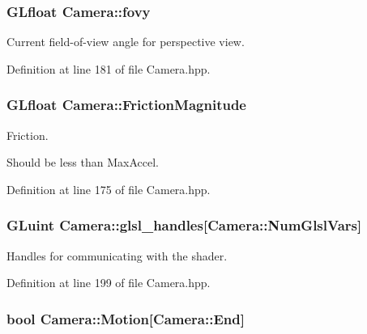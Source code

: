\hypertarget{class_camera_acc8b97facc57059530efad534c2f8314}{
\subsubsection[{fovy}]{\setlength{\rightskip}{0pt plus 5cm}G\-Lfloat Camera\-::fovy\hspace{0.3cm}{\ttfamily [private]}}}\label{class_camera_acc8b97facc57059530efad534c2f8314}


Current field-\/of-\/view angle for perspective view. 



Definition at line 181 of file Camera.\-hpp.

\hypertarget{class_camera_a4260507a4e59b2b079a0e1c6a5b64d5c}{
\subsubsection[{Friction\-Magnitude}]{\setlength{\rightskip}{0pt plus 5cm}G\-Lfloat Camera\-::\-Friction\-Magnitude\hspace{0.3cm}{\ttfamily [private]}}}\label{class_camera_a4260507a4e59b2b079a0e1c6a5b64d5c}


Friction. 

Should be less than Max\-Accel. 

Definition at line 175 of file Camera.\-hpp.

\hypertarget{class_camera_a1635486d7f9e0d52b241899a270ee335}{
\subsubsection[{glsl\-\_\-handles}]{\setlength{\rightskip}{0pt plus 5cm}G\-Luint Camera\-::glsl\-\_\-handles\mbox{[}Camera\-::\-Num\-Glsl\-Vars\mbox{]}\hspace{0.3cm}{\ttfamily [private]}}}\label{class_camera_a1635486d7f9e0d52b241899a270ee335}


Handles for communicating with the shader. 



Definition at line 199 of file Camera.\-hpp.

\hypertarget{class_camera_a39746b4fadf30bba6bdc8aa6acfdc6f2}{
\subsubsection[{Motion}]{\setlength{\rightskip}{0pt plus 5cm}bool Camera\-::\-Motion\mbox{[}Camera\-::\-End\mbox{]}\hspace{0.3cm}{\ttfamily [private]}}}\label{class_camera_a39746b4fadf30bba6bdc8aa6acfdc6f2}


